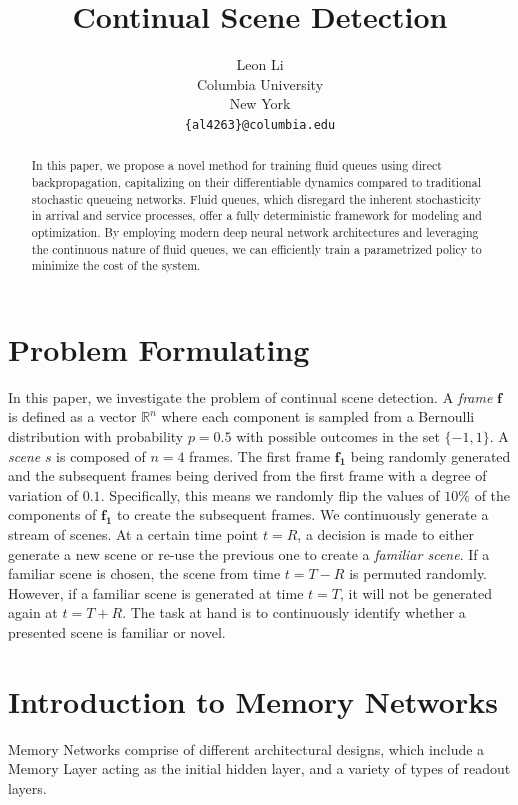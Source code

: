 \documentclass{article}
\title{Continual Scene Detection}
\author{
  Leon Li \\
  Columbia University \\
  New York\\
  \texttt{\{al4263\}@columbia.edu} \\
}
\begin{document}
\maketitle


\begin{abstract}
In this paper, we propose a novel method for training fluid queues using direct backpropagation, capitalizing on their differentiable dynamics compared to traditional stochastic queueing networks. Fluid queues, which disregard the inherent stochasticity in arrival and service processes, offer a fully deterministic framework for modeling and optimization. By employing modern deep neural network architectures and leveraging the continuous nature of fluid queues, we can efficiently train a parametrized policy to minimize the cost of the system.
\end{abstract}




\section{Problem Formulating}

In this paper, we investigate the problem of continual scene detection. A \textit{frame} $\boldsymbol{f}$ is defined as a vector $\mathbb{R}^n$ where each component is sampled from a Bernoulli distribution with probability $p=0.5$ with possible outcomes in the set $\{-1, 1\}$. A \textit{scene} $s$ is composed of $n=4$ frames. The first frame $\boldsymbol{f_1}$ being randomly generated and the subsequent frames being derived from the first frame with a degree of variation of $0.1$. Specifically, this means we randomly flip the values of $10\%$ of the components of $\boldsymbol{f_1}$ to create the subsequent frames. We continuously generate a stream of scenes. At a certain time point $t=R$, a decision is made to either generate a new scene or re-use the previous one to create a \textit{familiar scene}. If a familiar scene is chosen, the scene from time $t=T-R$ is permuted randomly. However, if a familiar scene is generated at time $t=T$, it will not be generated again at $t=T+R$. The task at hand is to continuously identify whether a presented scene is familiar or novel.


\section{Introduction to Memory Networks}

Memory Networks comprise of different architectural designs, which include a Memory Layer acting as the initial hidden layer, and a variety of types of readout layers. 
\end{document}
